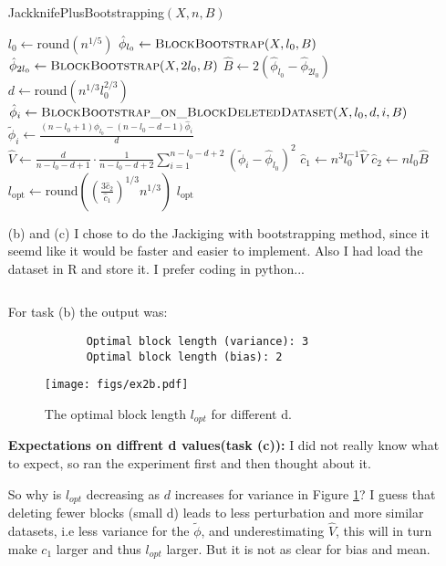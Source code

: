 \documentclass[a4paper,12pt]{article}
\theoremstyle{breaktheorem}
\theoremstyle{exerciseStyle}
\theoremstyle{solutionStyle}
\begin{document}
\begin{enumerate}
          \begin{algorithm}[H]
              \caption{JackknifePlusBootstrapping$(X, n, B)$}
              \begin{algorithmic}[1]
                  \State $l_0 \gets \text{round}(n^{1/5})$ 
                  \State $\hat{\phi}_{l_0} \gets \textsc{BlockBootstrap}(X, l_0, B)$ 
                  \State $\hat{\phi}_{2l_0} \gets \textsc{BlockBootstrap}(X, 2l_0, B)$ 
                  \State $\hat{B} \gets 2 ( \hat{\phi}_{l_0} - \hat{\phi}_{2l_0} )$ 
                  \State $d \gets \text{round}(n^{1/3} l_0^{2/3})$ 
                  \State $\hat{\phi}_i \gets \textsc{BlockBootstrap\_on\_BlockDeletedDataset}(X, l_0, d, i, B)$ 
                  \State $\tilde{\phi}_i \gets \frac{(n - l_0 + 1) \hat{\phi}_{l_0} - (n - l_0 - d - 1) \hat{\phi}_i}{d}$
                  \EndFor
                  \State $\hat{V} \gets \frac{d}{n - l_0 - d + 1} \cdot \frac{1}{n - l_0 - d + 2} \sum_{i=1}^{n - l_0 - d + 2} ( \tilde{\phi}_i - \hat{\phi}_{l_0} )^2$
                  \State $\hat{c}_1 \gets n^3 l_0^{-1} \hat{V}$
                  \State $\hat{c}_2 \gets n l_0 \hat{B}$
                  \State $l_{\text{opt}} \gets \text{round} \left( \left( \frac{3 \hat{c}_2}{\hat{c}_1} \right)^{1/3} n^{1/3} \right)$
                  \State \Return $l_{\text{opt}}$
              \end{algorithmic}
          \end{algorithm}

    \item [(b) and (c)]
          I chose to do the Jackiging with bootstrapping method, since it seemd like it would be faster and easier to implement.
          Also I had load the dataset in R and store it. I prefer coding in python...
          \inputminted[linenos, breaklines, frame=lines]{python}{ex2b.py}
          For task (b) the output was:
          \begin{verbatim}
            Optimal block length (variance): 3
            Optimal block length (bias): 2
        \end{verbatim}
          \begin{figure}[h]
              \centering
              \texttt{[image: figs/ex2b.pdf]}
              \caption{The optimal block length $l_{opt}$ for different d.}
              \label{fig:ex2b}
          \end{figure}
          \textbf{Expectations on diffrent d values(task (c)):}
          I did not really know what to expect, so ran the experiment first and then thought about it.

          So why is $l_{opt}$ decreasing as $d$ increases for variance in Figure \ref{fig:ex2b}? I guess that deleting fewer blocks (small d) leads to less
          perturbation and more similar datasets, i.e less variance for the $\tilde{\phi}$, and underestimating
          $\hat V$, this will in turn make $c_1$ larger and thus $l_{opt}$ larger.
          But it is not as clear for bias and mean.

\end{enumerate}
\end{document}
